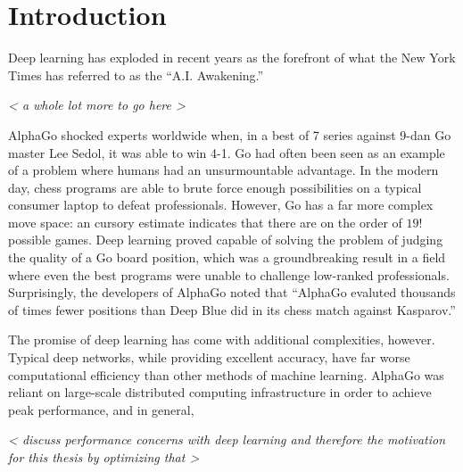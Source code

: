 \chapter{Introduction}

Deep learning has exploded in recent years as the forefront of what the New York Times has referred to as the ``A.I. Awakening.''

\emph{ < a whole lot more to go here > }

AlphaGo shocked experts worldwide when, in a best of 7 series against 9-dan Go master Lee Sedol, it was able to win 4-1.
Go had often been seen as an example of a problem where humans had an unsurmountable advantage.
In the modern day, chess programs are able to brute force enough possibilities on a typical consumer laptop to defeat professionals.
However, Go has a far more complex move space: an cursory estimate indicates that there are on the order of $19!$ possible games.
Deep learning proved capable of solving the problem of judging the quality of a Go board position, which was a groundbreaking result in a field where even the best programs were unable to challenge low-ranked professionals.
Surprisingly, the developers of AlphaGo noted that ``AlphaGo evaluted thousands of times fewer positions than Deep Blue did in its chess match against Kasparov.'' \cite{silver2016mastering}

The promise of deep learning has come with additional complexities, however.
Typical deep networks, while providing excellent accuracy, have far worse computational efficiency than other methods of machine learning.
AlphaGo was reliant on large-scale distributed computing infrastructure in order to achieve peak performance, and in general, 

\emph{ < discuss performance concerns with deep learning and therefore the motivation for this thesis by optimizing that > }

